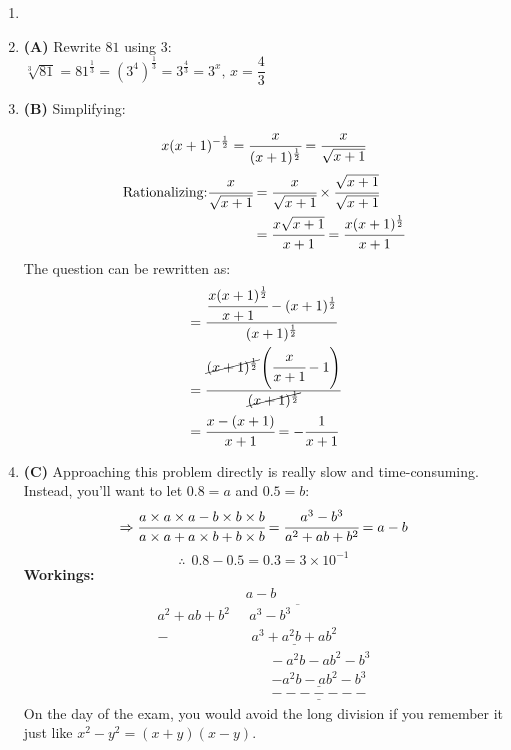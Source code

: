 \begin{multicols}{2}
\begin{enumerate}[label={\arabic*.}]
    \item 
    \item \textbf{(A)} Rewrite \( 81 \) using \( 3 \): \\ 
    \(\sqrt[3]{81} = 81^{\frac{1}{3}} = (3^4)^{\frac{1}{3}} = 3^{\frac{4}{3}} = 3^x, \, x = \dfrac{4}{3}\)
    \item \textbf{(B)} Simplifying:    
    \[x(x+1)^{-\frac{1}{2}} = \cfrac{x}{(x+1)^{\frac{1}{2}}} = \cfrac{x}{\sqrt{x+1}}\]
    \begin{align*}
    \text{Rationalizing:} \cfrac{x}{\sqrt{x+1}} &= \cfrac{x}{\sqrt{x+1}} \times \cfrac{\sqrt{x+1}}{\sqrt{x+1}} \\
    &= \cfrac{x\sqrt{x+1}}{x+1} = \cfrac{x(x+1)^{\frac{1}{2}}}{x+1}
    \end{align*} 
    The question can be rewritten as: 
    \begin{align*} 
        &= \cfrac{\cfrac{x(x+1)^{\frac{1}{2}}}{x+1} - (x+1)^{\frac{1}{2}}}{(x+1)^{\frac{1}{2}}} \\
        &= \cfrac{\cancel{(x+1)^{\frac{1}{2}}}\left(\cfrac{x}{x+1} - 1\right)}{\cancel{(x+1)^{\frac{1}{2}}}} \\
        &= \cfrac{x - (x+1)}{x+1} = -\cfrac{1}{x+1}
    \end{align*}

    \item \textbf{(C)} Approaching this problem directly is really slow and time-consuming. Instead, you'll want to let \( 0.8 = a \) and \( 0.5 = b \):
    \[\Rightarrow \cfrac{a \times a \times a - b \times b \times b}{a \times a + a \times b + b \times b} = \cfrac{a^3 - b^3}{a^2 + ab + b^2} = a - b\]
    \[\therefore \hspace{5pt} 0.8 - 0.5 = 0.3 = 3 \times 10^{-1}\]
        \textbf{Workings:} \vspace{-10pt}
        \begin{align*} 
            & a - b\\
            a^2 + ab + b^2 \,\, &\overline{ \hspace{3pt} a^3 - b^3 \hspace{50pt}} \\
            -& \hspace{5pt} \underline{a^3 + a^2b + ab^2} \\ 
            & \hspace{20pt} -a^2b - ab^2 - b^3 \\
            & \hspace{22pt} \underline{-a^2b - ab^2 - b^3} \\
            & \hspace{22pt} \underline{-------}
        \end{align*}
        On the day of the exam, you would avoid the long division if you remember it just like \( x^2 - y^2 = (x+y)(x-y) \). 


\end{enumerate}
\end{multicols}
